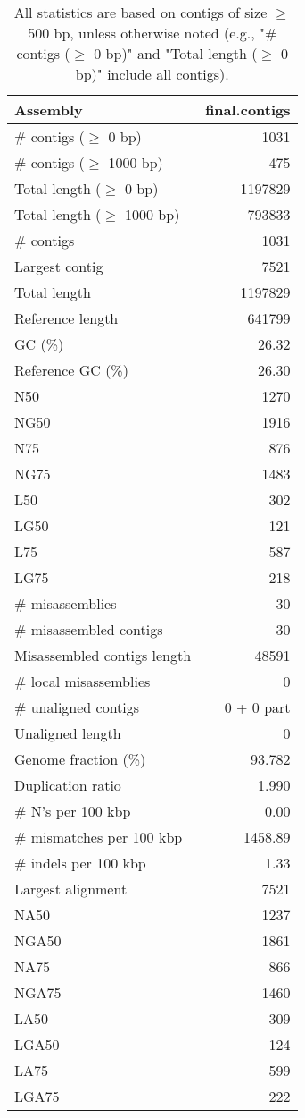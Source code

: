 \documentclass[12pt,a4paper]{article}
\begin{document}
\begin{table}[ht]
\begin{center}
\caption{All statistics are based on contigs of size $\geq$ 500 bp, unless otherwise noted (e.g., "\# contigs ($\geq$ 0 bp)" and "Total length ($\geq$ 0 bp)" include all contigs).}
\begin{tabular}{|l*{1}{|r}|}
\hline
Assembly & final.contigs \\ \hline
\# contigs ($\geq$ 0 bp) & 1031 \\ \hline
\# contigs ($\geq$ 1000 bp) & 475 \\ \hline
Total length ($\geq$ 0 bp) & 1197829 \\ \hline
Total length ($\geq$ 1000 bp) & 793833 \\ \hline
\# contigs & 1031 \\ \hline
Largest contig & 7521 \\ \hline
Total length & 1197829 \\ \hline
Reference length & 641799 \\ \hline
GC (\%) & 26.32 \\ \hline
Reference GC (\%) & 26.30 \\ \hline
N50 & 1270 \\ \hline
NG50 & 1916 \\ \hline
N75 & 876 \\ \hline
NG75 & 1483 \\ \hline
L50 & 302 \\ \hline
LG50 & 121 \\ \hline
L75 & 587 \\ \hline
LG75 & 218 \\ \hline
\# misassemblies & 30 \\ \hline
\# misassembled contigs & 30 \\ \hline
Misassembled contigs length & 48591 \\ \hline
\# local misassemblies & 0 \\ \hline
\# unaligned contigs & 0 + 0 part \\ \hline
Unaligned length & 0 \\ \hline
Genome fraction (\%) & 93.782 \\ \hline
Duplication ratio & 1.990 \\ \hline
\# N's per 100 kbp & 0.00 \\ \hline
\# mismatches per 100 kbp & 1458.89 \\ \hline
\# indels per 100 kbp & 1.33 \\ \hline
Largest alignment & 7521 \\ \hline
NA50 & 1237 \\ \hline
NGA50 & 1861 \\ \hline
NA75 & 866 \\ \hline
NGA75 & 1460 \\ \hline
LA50 & 309 \\ \hline
LGA50 & 124 \\ \hline
LA75 & 599 \\ \hline
LGA75 & 222 \\ \hline
\end{tabular}
\end{center}
\end{table}
\end{document}
